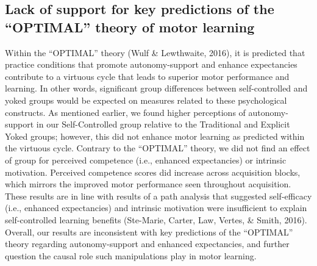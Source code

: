 \documentclass[
  english,
  doc, donotrepeattitle,floatsintext]{apa7}
\begin{document}
\hypertarget{lack-of-support-for-key-predictions-of-the-optimal-theory-of-motor-learning}{%
\subsection{Lack of support for key predictions of the ``OPTIMAL'' theory of motor learning}\label{lack-of-support-for-key-predictions-of-the-optimal-theory-of-motor-learning}}

Within the ``OPTIMAL'' theory (Wulf \& Lewthwaite, 2016), it is predicted that practice conditions that promote autonomy-support and enhance expectancies contribute to a virtuous cycle that leads to superior motor performance and learning. In other words, significant group differences between self-controlled and yoked groups would be expected on measures related to these psychological constructs. As mentioned earlier, we found higher perceptions of autonomy-support in our Self-Controlled group relative to the Traditional and Explicit Yoked groups; however, this did not enhance motor learning as predicted within the virtuous cycle. Contrary to the ``OPTIMAL'' theory, we did not find an effect of group for perceived competence (i.e., enhanced expectancies) or intrinsic motivation. Perceived competence scores did increase across acquisition blocks, which mirrors the improved motor performance seen throughout acquisition. These results are in line with results of a path analysis that suggested self-efficacy (i.e., enhanced expectancies) and intrinsic motivation were insufficient to explain self-controlled learning benefits (Ste-Marie, Carter, Law, Vertes, \& Smith, 2016). Overall, our results are inconsistent with key predictions of the ``OPTIMAL'' theory regarding autonomy-support and enhanced expectancies, and further question the causal role such manipulations play in motor learning.
\end{document}
